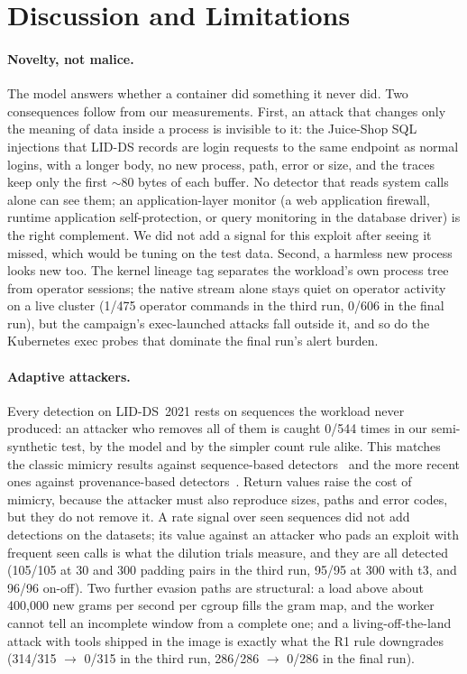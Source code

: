 \section{Discussion and Limitations}\label{sec:discussion}

\paragraph{Novelty, not malice.} The model answers whether a container did something it never did. Two consequences
follow from our measurements. First, an attack that changes only the meaning of data inside a process is invisible to
it: the Juice-Shop SQL injections that LID-DS records are login requests to the same endpoint as normal logins, with a
longer body, no new process, path, error or size, and the traces keep only the first ${\sim}80$ bytes of each buffer.
No detector that reads system calls alone can see them; an application-layer monitor (a web application firewall,
runtime application self-protection, or query monitoring in the database driver) is the right complement. We did not
add a signal for this exploit after seeing it missed, which would be tuning on the test data. Second, a harmless new
process looks new too. The kernel lineage tag separates the workload's own process tree from operator sessions; the
native stream alone stays quiet on operator activity on a live cluster (1/475 operator commands in the third run,
0/606 in the final run), but the campaign's exec-launched attacks fall outside it, and so do the Kubernetes exec
probes that dominate the final run's alert burden.

\paragraph{Adaptive attackers.} Every detection on LID-DS~2021 rests on sequences the workload never produced: an
attacker who removes all of them is caught 0/544 times in our semi-synthetic test, by the model and by the simpler
count rule alike. This matches the classic mimicry results against sequence-based detectors~\cite{wagner2002,tan2002}
and the more recent ones against provenance-based detectors~\cite{goyal2023}. Return values raise the cost of mimicry,
because the attacker must also reproduce sizes, paths and error codes, but they do not remove it. A rate signal over seen
sequences did not add detections on the datasets; its value against an attacker who pads an exploit with frequent seen
calls is what the dilution trials measure, and they are all detected (105/105 at 30 and 300 padding pairs in the third run,
95/95 at 300 with t3, and 96/96 on-off). Two further evasion paths are structural: a
load above about 400{,}000 new grams per second per cgroup fills the gram map, and the worker cannot tell an incomplete
window from a complete one; and a living-off-the-land attack with tools shipped in the image is exactly what the R1
rule downgrades (314/315 $\to$ 0/315 in the third run, 286/286 $\to$ 0/286 in the final run).

